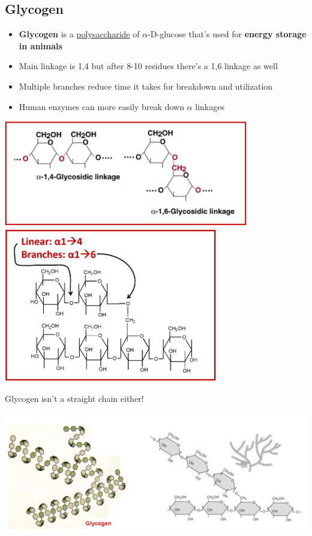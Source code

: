 \documentclass[10pt]{article}
\begin{document}
\subsection*{Glycogen}
\begin{itemize}
    \item \textbf{Glycogen} is a \underline{polysaccharide} of $\alpha$-D-glucose that's used for \textbf{energy storage in animals}
    \item Main linkage is 1,4 but after 8-10 residues there's a 1,6 linkage as well
    \item Multiple branches reduce time it takes for breakdown and utilization
    \item Human enzymes can more easily break down $\alpha$ linkages
\end{itemize}
\begin{center}
    \includegraphics*[width=0.8\textwidth]{L1_19.png}\\
    \includegraphics*[width=0.7\textwidth]{L1_20.png}
\end{center}
Glycogen isn't a straight chain either!
\begin{center}
    \includegraphics*[width=\textwidth]{L1_21.png}
\end{center}
\end{document}
